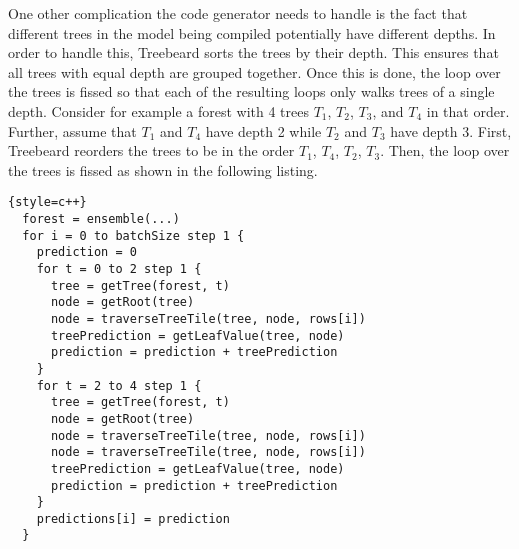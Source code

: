 One other complication the code generator needs to handle is the fact that different trees in the model being 
compiled potentially have different depths. In order to handle
this, Treebeard sorts the trees by their depth. This ensures that all trees with equal depth are grouped together. Once this is done, 
the loop over the trees is fissed so that each of the resulting loops only walks trees of a single depth. Consider for example a 
forest with 4 trees $T_1$, $T_2$, $T_3$, and $T_4$ in that order. Further, assume that $T_1$ and $T_4$ have depth 2 while $T_2$ and $T_3$
have depth 3. First, Treebeard reorders the trees to be in the order $T_1$, $T_4$, $T_2$, $T_3$. Then, the loop over the trees is fissed
as shown in the following listing.

\begin{lstlisting}{style=c++}
  forest = ensemble(...)
  for i = 0 to batchSize step 1 {
    prediction = 0
    for t = 0 to 2 step 1 {
      tree = getTree(forest, t) 
      node = getRoot(tree)
      node = traverseTreeTile(tree, node, rows[i])
      treePrediction = getLeafValue(tree, node)
      prediction = prediction + treePrediction
    }
    for t = 2 to 4 step 1 {
      tree = getTree(forest, t) 
      node = getRoot(tree)
      node = traverseTreeTile(tree, node, rows[i])
      node = traverseTreeTile(tree, node, rows[i])
      treePrediction = getLeafValue(tree, node)
      prediction = prediction + treePrediction
    }
    predictions[i] = prediction
  }  
\end{lstlisting}

